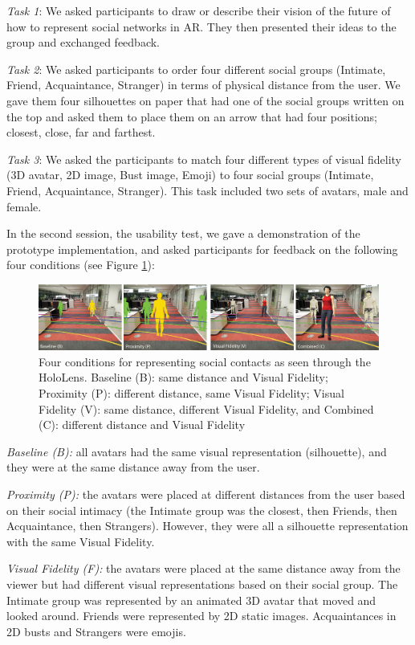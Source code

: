 \textit{Task 1}: We asked participants to draw or describe their vision of the future of how to represent social networks in AR. They then presented their ideas to the group and exchanged feedback.

\textit{Task 2}: We asked participants to order four different social groups (Intimate, Friend, Acquaintance, Stranger) in terms of physical distance from the user. We gave them four silhouettes on paper that had one of the social groups written on the top and asked them to place them on an arrow that had four positions; closest, close, far and farthest.

\textit{Task 3}: We asked the participants to match four different types of visual fidelity (3D avatar, 2D image, Bust image, Emoji) to four social groups (Intimate, Friend, Acquaintance, Stranger). This task included two sets of avatars, male and female.

In the second session, the usability test, we gave a demonstration of the prototype implementation, and asked participants for feedback on the following four conditions (see Figure \ref{fig:contacts:conditions}): 
\begin{figure}[h]
    \centering
    \includegraphics[width=\linewidth]{images/mgia17/conditions-transparent-background}
    \caption{Four conditions for representing social contacts as seen through the HoloLens. Baseline (B): same distance and Visual Fidelity; Proximity (P): different distance, same Visual Fidelity; Visual Fidelity (V): same distance, different Visual Fidelity, and Combined (C): different distance and Visual Fidelity}
    \label{fig:contacts:conditions}
\end{figure}

\textit{Baseline (B):} all avatars had the same visual representation (silhouette), and they were at the same distance away from the user.

\textit{Proximity (P):} the avatars were placed at different distances from the user based on their social intimacy (the Intimate group was the closest, then Friends, then Acquaintance, then Strangers). However, they were all a silhouette representation with the same Visual Fidelity.

\textit{Visual Fidelity (F):} the avatars were placed at the same distance away from the viewer but had different visual representations based on their social group. The Intimate group was represented by an animated 3D avatar that moved and looked around. Friends were represented by 2D static images. Acquaintances in 2D busts and Strangers were emojis.

